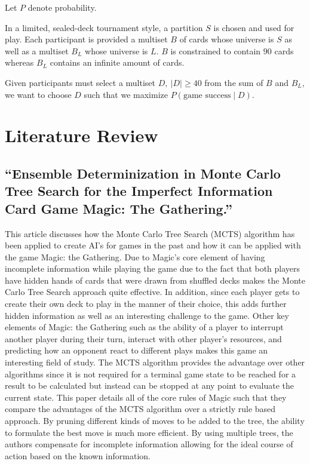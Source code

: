 \documentclass[12pt, letterpaper]{article}
\begin{document}
Let $ P $ denote probability.

In a limited, sealed-deck tournament style, a partition $ S $ is chosen and used for play.
Each participant is provided a multiset $ B $ of cards whose universe is $ S $
as well as a multiset $ B_L $ whose universe is $ L $.
$ B $ is constrained to contain $ 90 $ cards
whereas $ B_L $ contains an infinite amount of cards.

Given participants must select a multiset $ D, \ |D| \ge 40 $ from the sum of $ B $ and $ B_L $,
we want to choose $ D $ such that we maximize $ P(\text{game success} \mid D) $.

\section{Literature Review}

\subsection{\enquote{Ensemble Determinization in Monte Carlo Tree Search for the Imperfect Information Card Game Magic: The Gathering.}}
\label{sec:3.1}

This article discusses how the Monte Carlo Tree Search (MCTS) algorithm
has been applied to create AI's for games in the
past and how it can be applied with the game Magic: the Gathering.
Due to Magic's core element of having incomplete information while playing the game
due to the fact that both players have hidden hands of cards that were drawn from
shuffled decks makes the Monte Carlo Tree Search approach quite effective.
In addition,
since each player gets to create their own deck to play in the manner of their choice,
this adds further hidden information as well as an interesting challenge to the game.
Other key elements of Magic: the Gathering such as the ability of a player to
interrupt another player during their turn,
interact with other player's resources, and predicting how an opponent
react to different plays makes this game an interesting field of study.
The MCTS algorithm provides the advantage over
other algorithms since it is not required for a terminal game state to be reached for a result to be calculated
but instead can be stopped at any point to evaluate the current state.
This paper details all of the core rules of Magic such that they compare the advantages of the
MCTS algorithm over a strictly rule based approach.
By pruning different kinds of moves to be added to the tree,
the ability to formulate the best move is much more efficient.
By using multiple trees,
the authors compensate for incomplete information allowing for the ideal course of action based on the known information.
\end{document}
